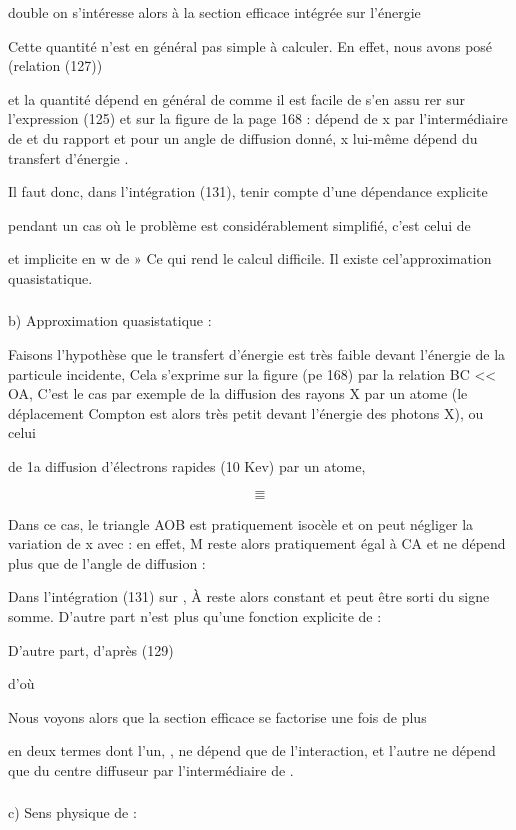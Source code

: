 {{{double  on s'intéresse alors à la section efficace intégrée sur
l'énergie

Cette quantité n'est en général pas simple à calculer. En effet, nous avons
posé (relation (127))

et la quantité dépend en général de  comme il est facile de s'en assu
rer sur l'expression (125) et sur la figure de la page 168 :  dépend de x
par l'intermédiaire de  et du rapport  et pour un angle de diffusion
 donné, x lui-même dépend du transfert d'énergie .

Il faut donc, dans l'intégration (131), tenir compte d'une dépendance explicite

pendant un cas où le problème est considérablement simplifié, c'est celui de

et implicite en w de » Ce qui rend le calcul difficile. Il existe cel'approximation quasistatique.

\subsubsection{}%
b) Approximation quasistatique :

Faisons l'hypothèse que le transfert d'énergie est très faible
devant l'énergie de la particule incidente, Cela s'exprime sur la figure
(pe 168) par la relation BC << OA,
C'est le cas par exemple de la diffusion des rayons X par un atome (le déplacement
Compton est alors très petit devant l'énergie des photons X), ou celui

de 1a diffusion d'électrons rapides (10 Kev) par un atome,

\[
\tag{132}=
\]
\[
\tag{133}=
\]

Dans ce cas, le triangle AOB est pratiquement isocèle et on
peut négliger la variation de x avec  : en effet, M reste alors pratiquement égal
à CA et ne dépend plus que de l'angle de diffusion :

Dans l'intégration (131) sur , À reste alors constant et peut être sorti
du signe somme. D'autre part  n'est plus qu'une fonction explicite
de  :

D'autre part, d'après (129)

d'où

Nous voyons alors que la section efficace se factorise une fois de plus

en deux termes dont l'un, , ne dépend que de l'interaction, et l'autre ne
dépend que du centre diffuseur par l'intermédiaire de .

\subsubsection{}%
c) Sens physique de :

}}}
